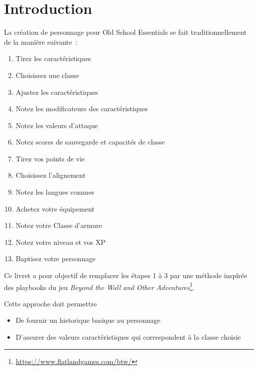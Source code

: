 \chapter{Introduction}

La création de personnage pour Old School Essentials se fait traditionnellement de la manière suivante~:
\begin{enumerate}
  \item Tirez les caractéristiques
  \item Choisissez une classe
  \item Ajustez les caractéristiques
  \item Notez les modificateurs des caractéristiques
  \item Notez les valeurs d'attaque
  \item Notez scores de sauvegarde et capacités de classe
  \item Tirez vos points de vie
  \item Choisissez l'alignement
  \item Notez les langues connues
  \item Achetez votre équipement
  \item Notez votre Classe d'armure
  \item Notez votre niveau et vos XP
  \item Baptisez votre personnage
\end{enumerate}

Ce livret a pour objectif de remplacer les étapes 1 à 3 par une méthode inspîrée des playbooks du jeu \emph{Beyond the Wall and Other Adventures}\footnote{\url{https://www.flatlandgames.com/btw/}}.

Cette approche doit permettre
\begin{itemize}
  \item De fournir un historique basique au personnage
  \item D'assurer des valeurs caractéristiques qui correspondent à la classe choisie
\end{itemize}

